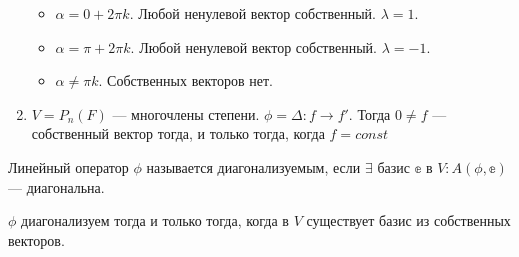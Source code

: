\begin{Examples}
\begin{enumerate}
        \begin{itemize}
            \item $\alpha = 0 + 2\pi k$. Любой ненулевой вектор собственный. $\lambda = 1$.
            \item $\alpha = \pi + 2\pi k$. Любой ненулевой вектор собственный. $\lambda = -1$.
            \item $\alpha \neq \pi k$. Собственных векторов нет.
        \end{itemize}
        \item $V = P_n(F)$ --- многочлены степени. $\phi = \Delta\colon f \rightarrow f'$. Тогда $0 \neq f$ --- собственный вектор тогда, и только тогда, когда $f = const$ 
    \end{enumerate}
\end{Examples}
\begin{Def}
    Линейный оператор $\phi$ называется диагонализуемым, если $\exists$ базис $\mathbb{e}$ в $V\colon A(\phi, \mathbb{e})$ --- диагональна. 
\end{Def}
\begin{Suggestion}
    $\phi$ диагонализуем тогда и только тогда, когда в $V$ существует базис из собственных векторов.
\end{Suggestion}

